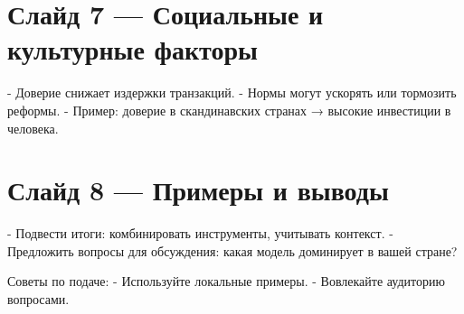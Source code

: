 \documentclass[12pt]{article}
\begin{document}
\section*{Слайд 7 — Социальные и культурные факторы}
- Доверие снижает издержки транзакций.
- Нормы могут ускорять или тормозить реформы.
- Пример: доверие в скандинавских странах → высокие инвестиции в человека.

\section*{Слайд 8 — Примеры и выводы}
- Подвести итоги: комбинировать инструменты, учитывать контекст.
- Предложить вопросы для обсуждения: какая модель доминирует в вашей стране?

\bigskip
Советы по подаче:
- Используйте локальные примеры.
- Вовлекайте аудиторию вопросами.
\end{document}
